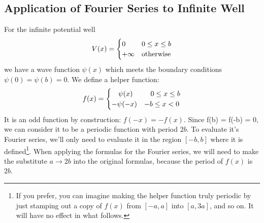 \documentclass[12pt]{book}
\begin{document}
\subsection{Application of Fourier Series to Infinite Well}

For the infinite potential well
\begin{equation}
V(x) = 
\begin{cases}    
   0 & 0 \leq x \leq b \\
   +\infty & {\rm otherwise} \\
\end{cases}   
\end{equation}
we have a wave function $\psi(x)$ which meets the boundary conditions $\psi(0) = \psi(b) = 0$.  We define a helper function:
\begin{equation*}
f(x) = 
\begin{cases}    
  \hspace{9.5pt}\psi(x)  & \hspace{9pt} 0 \leq x \leq b \\
  -\psi(-x) & -b \leq x < 0 \\
\end{cases}   
\end{equation*}
It is an odd function by construction:  $f(-x) = -f(x)$.  Since f(b) = f(-b) = 0, we can consider it to be a periodic function with period $2b$. To evaluate it's Fourier series, we'll only need to evaluate it in the region $[-b,b]$ where it is defined\footnote{If you prefer, you can imagine making the helper function truly periodic by just stamping out a copy of $f(x)$ from $[-a,a]$ into $[a,3a]$, and so on.  It will have no effect in what follows.}.  When applying the formulas for the Fourier series, we will need to make the substitute $a \to 2b$ into the original formulas, because the period of $f(x)$ is $2b$.
\end{document}

